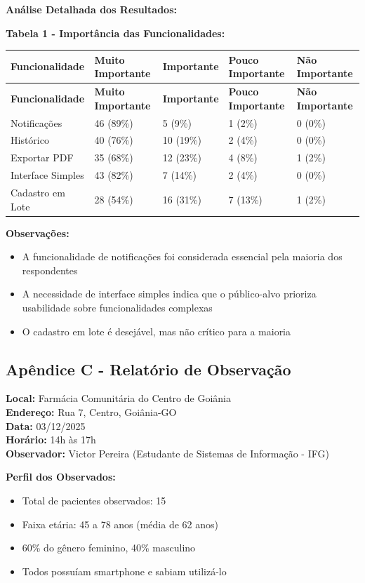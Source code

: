 \documentclass[12pt]{article}
\begin{document}
\textbf{Análise Detalhada dos Resultados:}

\textbf{Tabela 1 - Importância das Funcionalidades:}

\begin{longtable}{|p{4cm}|p{3cm}|p{3cm}|p{3cm}|p{3cm}|}
\hline
\textbf{Funcionalidade} & \textbf{Muito Importante} & \textbf{Importante} & \textbf{Pouco Importante} & \textbf{Não Importante} \\
\hline
\endfirsthead
\hline
\textbf{Funcionalidade} & \textbf{Muito Importante} & \textbf{Importante} & \textbf{Pouco Importante} & \textbf{Não Importante} \\
\hline
\endhead
Notificações & 46 (89\%) & 5 (9\%) & 1 (2\%) & 0 (0\%) \\
\hline
Histórico & 40 (76\%) & 10 (19\%) & 2 (4\%) & 0 (0\%) \\
\hline
Exportar PDF & 35 (68\%) & 12 (23\%) & 4 (8\%) & 1 (2\%) \\
\hline
Interface Simples & 43 (82\%) & 7 (14\%) & 2 (4\%) & 0 (0\%) \\
\hline
Cadastro em Lote & 28 (54\%) & 16 (31\%) & 7 (13\%) & 1 (2\%) \\
\hline
\end{longtable}

\textbf{Observações:}
\begin{itemize}
    \item A funcionalidade de notificações foi considerada essencial pela maioria dos respondentes
    \item A necessidade de interface simples indica que o público-alvo prioriza usabilidade sobre funcionalidades complexas
    \item O cadastro em lote é desejável, mas não crítico para a maioria
\end{itemize}

\subsection{Apêndice C - Relatório de Observação}

\textbf{Local:} Farmácia Comunitária do Centro de Goiânia \\
\textbf{Endereço:} Rua 7, Centro, Goiânia-GO \\
\textbf{Data:} 03/12/2025 \\
\textbf{Horário:} 14h às 17h \\
\textbf{Observador:} Victor Pereira (Estudante de Sistemas de Informação - IFG)

\textbf{Perfil dos Observados:}
\begin{itemize}
    \item Total de pacientes observados: 15
    \item Faixa etária: 45 a 78 anos (média de 62 anos)
    \item 60\% do gênero feminino, 40\% masculino
    \item Todos possuíam smartphone e sabiam utilizá-lo
\end{itemize}
\end{document}

